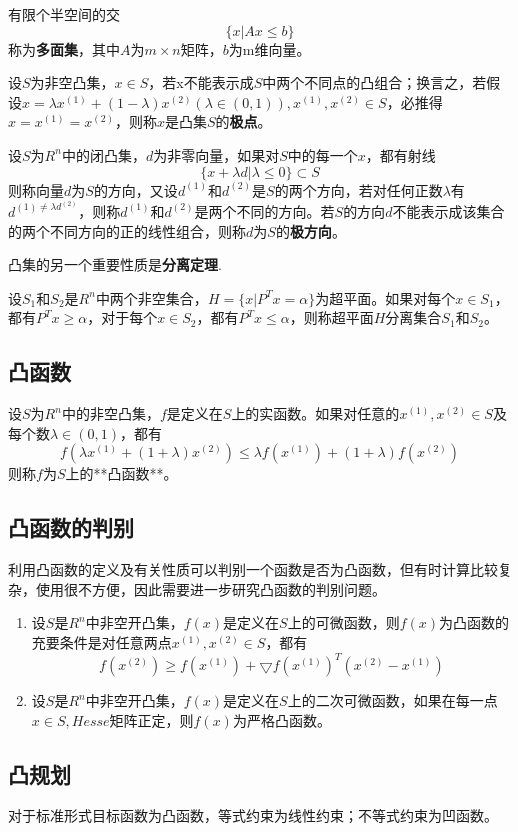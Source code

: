 有限个半空间的交
$$\{x| Ax \leq b\}$$
称为\textbf{多面集}，其中$A$为$m\times n$矩阵，$b$为m维向量。

设$S$为非空凸集，$x \in S$，若x不能表示成$S$中两个不同点的凸组合；换言之，若假设$x = \lambda x^{(1)} + (1 - \lambda)x^{(2)} (\lambda \in (0,1)),x^{(1)} ,x^{(2)}\in S$，必推得$x = x^{(1)} = x^{(2)}$，则称$x$是凸集$S$的\textbf{极点}。

设$S$为$R^n$中的闭凸集，$d$为非零向量，如果对$S$中的每一个$x$，都有射线
\begin{equation}
	\{ x+\lambda d | \lambda \leq 0 \} \subset S
\end{equation}
则称向量$d$为$S$的方向，又设$d^{(1)}\text{和}d^{(2)}$是$S$的两个方向，若对任何正数$\lambda$有$d^{(1) \ne \lambda d^{(2)}}$，则称$d^{(1)}$和$d^{(2)}$是两个不同的方向。若$S$的方向$d$不能表示成该集合的两个不同方向的正的线性组合，则称$d$为$S$的\textbf{极方向}。

凸集的另一个重要性质是\textbf{分离定理}.

设$S_1$和$S_2$是$R^n$中两个非空集合，$H=\{x|P^Tx = \alpha\}$为超平面。如果对每个$x \in S_1$，都有$P^T x \geq \alpha$，对于每个$x\in S_2$，都有$P^Tx \leq \alpha$，则称超平面$H$分离集合$S_1$和$S_2$。

\subsection*{凸函数}
设$S$为$R^n$中的非空凸集，$f$是定义在$S$上的实函数。如果对任意的$x^{(1)},x^{(2)}\in S$及每个数$\lambda\in (0,1)$，都有
\begin{equation}
	f(\lambda x^{(1)} + (1+\lambda )x^{(2)} )\leq \lambda f(x^{(1)}) + (1+\lambda)f(x^{(2)})
\end{equation}
则称$f$为$S$上的**凸函数**。
\subsection*{凸函数的判别}
利用凸函数的定义及有关性质可以判别一个函数是否为凸函数，但有时计算比较复杂，使用很不方便，因此需要进一步研究凸函数的判别问题。
\begin{enumerate}
	\item 设$S$是$R^n$中非空开凸集，$f(x)$是定义在$S$上的可微函数，则$f(x)$为凸函数的充要条件是对任意两点$x^{(1)},x^{(2)} \in S$，都有
	\begin{equation}
		f(x^{(2)}) \geq f(x^{(1)}) + \bigtriangledown f(x^{(1)})^T (x^{(2)} - x^{(1)})
	\end{equation}
	\item 设$S$是$R^n$中非空开凸集，$f(x)$是定义在$S$上的二次可微函数，如果在每一点$x \in S,Hesse$矩阵正定，则$f(x)$为严格凸函数。
\end{enumerate}
\subsection*{凸规划}
对于标准形式目标函数为凸函数，等式约束为线性约束；不等式约束为凹函数。




